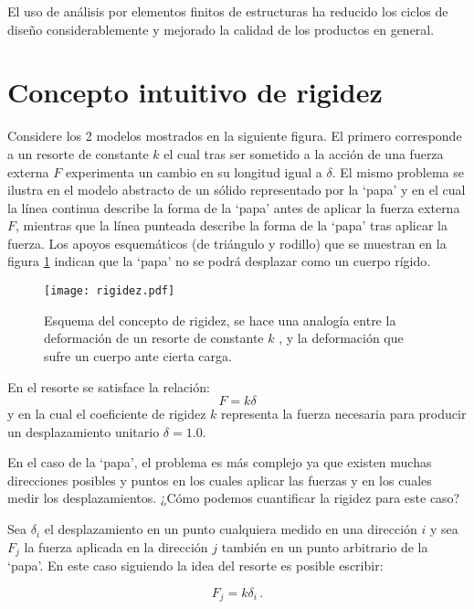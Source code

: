 El uso de análisis por elementos finitos de estructuras ha reducido los ciclos de diseño considerablemente y mejorado la calidad de los productos en general. 



\section{Concepto intuitivo de rigidez}
Considere los 2 modelos mostrados en la siguiente figura. El primero 
corresponde a un resorte de constante $k$ el cual tras ser sometido a la acción 
de una fuerza externa $F$ experimenta un cambio en su longitud igual a 
$\delta$. El mismo problema se ilustra en el modelo abstracto de un sólido 
representado por la `papa' y en el cual la línea continua describe la forma de 
la `papa' antes de aplicar la fuerza externa $F$, mientras que la línea 
punteada describe la forma de la `papa' tras aplicar la fuerza. Los apoyos 
esquemáticos (de triángulo y rodillo) que se muestran en la figura 
\ref{fig:rigidez} indican que la `papa' no se podrá desplazar como un cuerpo 
rígido.

\begin{figure}[H]
\centering
\texttt{[image: rigidez.pdf]}
\caption{Esquema del concepto de rigidez, se hace una analogía entre la 
deformación de un resorte de constante $k$ , y la deformación que sufre un 
cuerpo ante cierta carga.}
\label{fig:rigidez}
\end{figure}

En el resorte se satisface la relación:
\begin{equation*}
F = k \delta
\end{equation*}
y en la cual el coeficiente de rigidez $k$ representa la fuerza necesaria para 
producir un desplazamiento unitario $\delta = 1.0$.

En el caso de la `papa', el problema es más complejo ya que existen muchas 
direcciones posibles y puntos en los cuales aplicar las fuerzas y en los cuales 
medir los desplazamientos. ¿Cómo podemos cuantificar la rigidez para este caso?

Sea $\delta _i$ el desplazamiento en un punto cualquiera medido en una 
dirección $i$ y sea $F_j$ la fuerza aplicada en la dirección $j$ también en un 
punto arbitrario de la `papa'. En este caso siguiendo la idea del resorte es 
posible escribir:

\begin{equation*}
F_j = k \delta_i\, .
\end{equation*}

